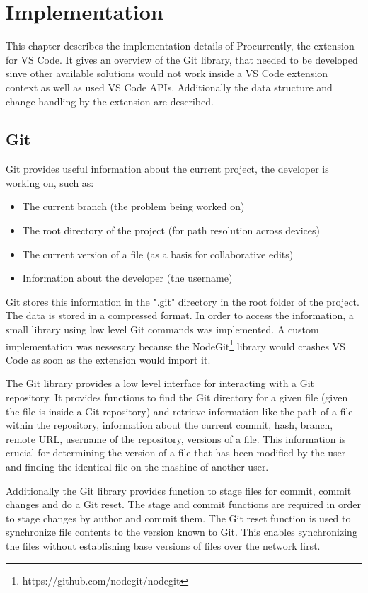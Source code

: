 \chapter{Implementation}

This chapter describes the implementation details of Procurrently, the extension for VS Code. It gives an overview of the Git library, that needed to be developed sinve other available solutions would not work inside a VS Code extension context as well as used VS Code APIs. Additionally the data structure and change handling by the extension are described.

\section{Git}

Git provides useful information about the current project, the developer is working on, such as:
\begin{itemize}
    \item The current branch (the problem being worked on)
    \item The root directory of the project (for path resolution across devices)
    \item The current version of a file (as a basis for collaborative edits)
    \item Information about the developer (the username)
\end{itemize}

Git stores this information in the ".git" directory in the root folder of the project.
The data is stored in a compressed format. In order to access the information, a small library using low level Git commands was implemented. 
A custom implementation was nessesary because the NodeGit\footnote{https://github.com/nodegit/nodegit} library would crashes VS Code as soon as the extension would import it.

The Git library provides a low level interface for interacting with a Git repository. It provides functions to find the Git directory for a given file (given the file is inside a Git repository) and retrieve information like the path of a file within the repository, information about the current commit, hash, branch, remote URL, username of the repository, versions of a file. This information is crucial for determining the version of a file that has been modified by the user and finding the identical file on the mashine of another user.

Additionally the Git library provides function to stage files for commit, commit changes and do a Git reset. The stage and commit functions are required in order to stage changes by author and commit them. The Git reset function is used to synchronize file contents to the version known to Git. This enables synchronizing the files without establishing base versions of files over the network first.

